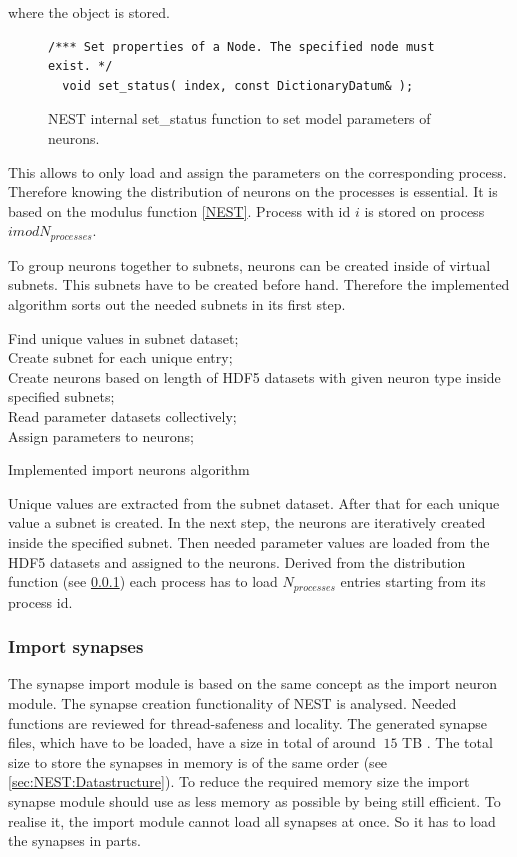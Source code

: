 where the object is stored.
\begin{figure}[ht!]
\begin{lstlisting}[style=cppcode]
/*** Set properties of a Node. The specified node must exist. */
  void set_status( index, const DictionaryDatum& );
\end{lstlisting}
\caption{NEST internal set\_{}status function to set model parameters of neurons.}
\label{code:setstatus}
\end{figure}
This allows to only load and assign the parameters on the corresponding process.
Therefore knowing the distribution of neurons on the processes is essential.
It is based on the modulus function \ref{NEST}.
Process with id $i$ is stored on process $i mod N_{processes}$.

To group neurons together to subnets, neurons can be created inside of virtual subnets.
This subnets have to be created before hand.
Therefore the implemented algorithm sorts out the needed subnets in its first step.
\begin{algorithm}[ht!]
 Find unique values in subnet dataset; \\
 Create subnet for each unique entry; \\
 Create neurons based on length of HDF5 datasets with given neuron type inside specified subnets; \\
 Read parameter datasets collectively; \\
 Assign parameters to neurons;
\label{alg2}
\caption{Implemented import neurons algorithm}
\end{algorithm}
Unique values are extracted from the subnet dataset.
After that for each unique value a subnet is created.
In the next step, the neurons are iteratively created inside the specified subnet.
Then needed parameter values are loaded from the HDF5 datasets and assigned to the neurons.
Derived from the distribution function (see \ref{}) each process has to load $N_{processes}$
entries starting from its process id.

\newpage
\subsubsection{Import synapses}
The synapse import module is based on the same concept as the import neuron module.
The synapse creation functionality of NEST is analysed.
Needed functions are reviewed for thread-safeness and locality.
The generated synapse files, which have to be loaded, have a size in total of around $~15$ TB .
The total size to store the synapses in memory is of the same order (see \ref{sec:NEST:Datastructure}).
To reduce the required memory size the import synapse module should use as less memory
as possible by being still efficient.
To realise it, the import module cannot load all synapses at once.
So it has to load the synapses in parts.

